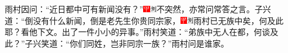 {雨村因问：``近日都中可有新闻没有？''{\includegraphics[width=3mm]{../Images/00002}\includegraphics[width=3mm]{../Images/00011}\footnotesize \kaishu 不突然，亦常问常答之言。}子兴道：``倒没有什么新闻，倒是老先生你贵同宗家，{\includegraphics[width=3mm]{../Images/00002}\includegraphics[width=3mm]{../Images/00011}\footnotesize \kaishu 雨村已无族中矣，何及此耶？看他下文。}出了一件小小的异事。''雨村笑道：``弟族中无人在都，何谈及此？''子兴笑道：``你们同姓，岂非同宗一族？''雨村问是谁家。

}
